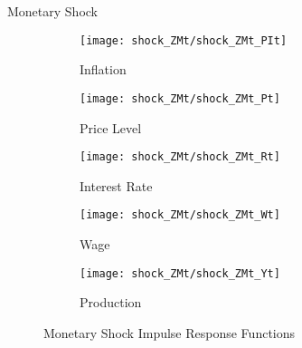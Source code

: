 \documentclass[../quali_slides.tex]{subfiles}
\begin{document}
\begin{frame}{Monetary Shock}
	
	\begin{figure}[h!]
		\centering
		\begin{subfigure}[b]{0.3\textwidth}
			\centering
			\texttt{[image: shock\_ZMt/shock\_ZMt\_PIt]}
			\caption{Inflation}
			\label{fig:ZMt-inflation}
		\end{subfigure}
		\hfill
		\begin{subfigure}[b]{0.3\textwidth}
			\centering
			\texttt{[image: shock\_ZMt/shock\_ZMt\_Pt]}
			\caption{Price Level}
			\label{fig:ZMt-price}
		\end{subfigure}
		\hfill
		\begin{subfigure}[b]{0.3\textwidth}
			\centering
			\texttt{[image: shock\_ZMt/shock\_ZMt\_Rt]}
			\caption{Interest Rate}
			\label{fig:ZMt-interest-rate}
		\end{subfigure}
		\hfill
		
		\vspace*{0.5cm}
		
		\hfill
		\begin{subfigure}[b]{0.3\textwidth}
			\centering
			\texttt{[image: shock\_ZMt/shock\_ZMt\_Wt]}
			\caption{Wage}
			\label{fig:ZMt-wage}
		\end{subfigure}
		\hfill
		\begin{subfigure}[b]{0.3\textwidth}
			\centering
			\texttt{[image: shock\_ZMt/shock\_ZMt\_Yt]}
			\caption{Production}
			\label{fig:ZMt-production}
		\end{subfigure}
		\hfill
		\hfill
		\caption{Monetary Shock Impulse Response Functions}
		\label{fig:ZMt-irf}
	\end{figure}
	
\end{frame}
\end{document}
